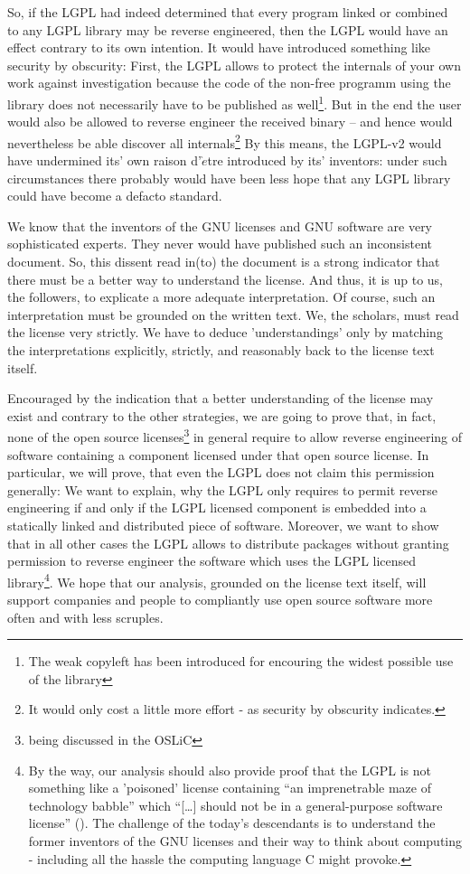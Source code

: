 So, if the LGPL had indeed determined that every program linked or combined to
any LGPL library may be reverse engineered, then the LGPL would have an effect
contrary to its own intention. It would have introduced something like security
by obscurity: First, the LGPL allows to protect the internals of your own work
against investigation because the code of the non-free programm using the
library does not necessarily have to be published as well\footnote{The weak
copyleft has been introduced for encouring the widest possible use of the
library}. But in the end the user would also be allowed to reverse engineer the
received binary -- and hence would nevertheless be able discover all
internals\footnote{It would only cost a little more effort - as security by
obscurity indicates.} By this means, the LGPL-v2 would have undermined its' own
raison d'$\grave{e}$tre introduced by its' inventors: under such circumstances
there probably would have been less hope that any LGPL library could have become
a defacto standard.

We know that the inventors of the GNU licenses and GNU software are very
sophisticated experts. They never would have published such an inconsistent
document. So, this dissent read in(to) the document is a strong indicator that
there must be a better way to understand the license. And thus, it is up to us,
the followers, to explicate a more adequate interpretation. Of course, such an
interpretation must be grounded on the written text. We, the scholars, must read
the license very strictly. We have to deduce 'understandings' only by matching
the interpretations explicitly, strictly, and reasonably back to the license
text itself.

Encouraged by the indication that a better understanding of the license may
exist and contrary to the other strategies, we are going to prove that, in
fact, none of the open source licenses\footnote{being discussed in the OSLiC} in
general require to allow reverse engineering of software containing a component
licensed under that open source license. In particular, we will prove, that even
the LGPL does not claim this permission generally: We want to explain, why the
LGPL only requires to permit reverse engineering if and only if the LGPL
licensed component is embedded into a statically linked and distributed piece of
software. Moreover, we want to show that in all other cases the LGPL allows 
to distribute packages without granting permission to reverse engineer the
software which uses the LGPL licensed library\footnote{By the way, our analysis
should also provide proof that the LGPL is not something like a 'poisoned'
license containing \enquote{an imprenetrable maze of technology babble} which
\enquote{[\ldots] should not be in a general-purpose software license}
(\cite[cf.][124]{Rosen2005a}). The challenge of the today's descendants is to
understand the former inventors of the GNU licenses and their way to think about
computing - including all the hassle the computing language C might provoke.}.
We hope that our analysis, grounded on the license text itself, will support
companies and people to compliantly use open source software more often and with
less scruples.

